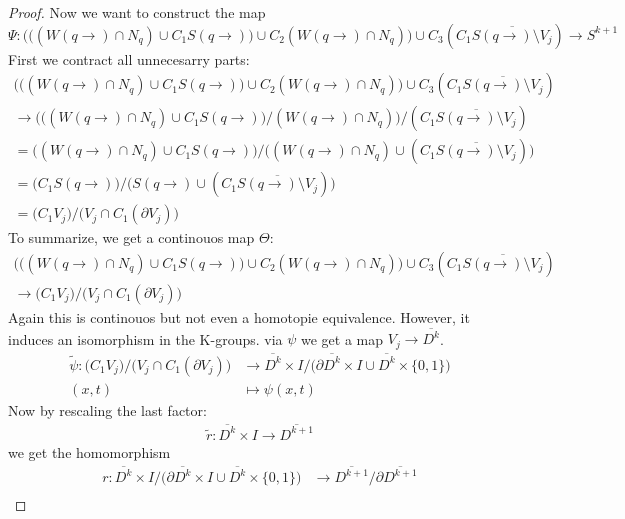\begin{proof}
Now we want to construct the map 
\begin{equation}
	\Psi: \Bigg( \Big( (W(q\to )\cap N_q)\cup C_1 S(q\to)\Big)\cup C_2 (W(q\to )\cap N_q)\Bigg)\cup  C_3 (C_1 \overline{S(q\to)\setminus V_j}) \to S^{k+1}
\end{equation}
First we contract all unnecesarry parts: 
\begin{align*}
	\Bigg( \Big( (W(q\to )\cap N_q)\cup C_1 S(q\to)\Big)\cup C_2 (W(q\to )\cap N_q)\Bigg)\cup  C_3 (C_1 \overline{S(q\to)\setminus V_j}) \\
	\to \Bigg( \Big( (W(q\to )\cap N_q)\cup C_1 S(q\to)\Big) \Big/ (W(q\to )\cap N_q)\Bigg) \Big/ (C_1 \overline{S(q\to)\setminus V_j}) \\
	=   \Big( (W(q\to )\cap N_q)\cup C_1 S(q\to)\Big)         \Big/     
	\Big( (W(q\to )\cap N_q) \cup (C_1 \overline{S(q\to)\setminus V_j}) \Big) \\
	= \Big( C_1 S(q\to)  \Big)  \big/   \big( S(q\to ) \cup (C_1 \overline{S(q\to)\setminus V_j}) \big)\\
	= \big( C_1 V_j \big)\big/ \big( V_j \cap C_1(\partial V_j)\big) 
\end{align*}
To summarize, we get a continouos map $\Theta$: 
\begin{align*}
	\Bigg( \Big( (W(q\to )\cap N_q)\cup C_1 S(q\to)\Big)\cup C_2 (W(q\to )\cap N_q)\Bigg)\cup  C_3 (C_1 \overline{S(q\to)\setminus V_j}) \\ 
	\to \big( C_1 V_j \big)\big/ \big( V_j \cap C_1(\partial V_j)\big) 
\end{align*}
Again this is continouos but not even a homotopie equivalence. However, it induces an isomorphism in the K-groups. 
via $\psi$ we get a map $V_j\to \overline{D^k}$. 
\begin{align*}
	\tilde{\psi}: \big( C_1 V_j \big)\big/ \big( V_j \cap C_1(\partial V_j)\big)  &\to \overline{D^k}\times I \big/ \big(\partial \overline{D^k}\times I\cup \overline{D^k}\times \{0,1\} \big)\\
	(x,t)					&\mapsto \psi(x,t)
\end{align*}
Now by rescaling the last factor:
\begin{align*}
	\tilde{r}: \overline{D^k}\times I \to \overline{D^{k+1}}
\end{align*} 
we get the homomorphism
\begin{align*}
	r:\overline{D^k}\times I \big/ \big(\partial \overline{D^k}\times I\cup \overline{D^k}\times \{0,1\} \big) 
				&\to \overline{D^{k+1}} \big/ \partial \overline{D^{k+1}}\\

\end{align*}
\end{proof}
